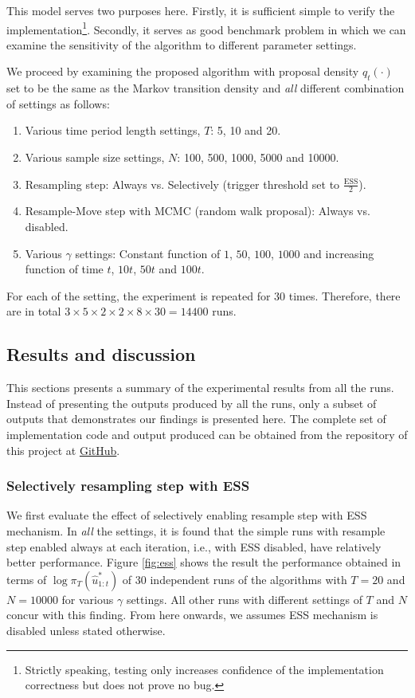 This model serves two purposes here. Firstly, it is sufficient simple to verify the implementation\footnote{Strictly speaking, testing only increases confidence of the implementation correctness but does not prove no bug.}. Secondly, it serves as good benchmark problem in which we can examine the sensitivity of the algorithm to different parameter settings.

We proceed by examining the proposed algorithm with proposal density $q_t(\cdot)$ set to be the same as the Markov transition density and \emph{all} different combination of settings as follows:
\begin{enumerate}
\item Various time period length settings, $T$: 5, 10 and 20.
\item Various sample size settings, $N$: 100, 500, 1000, 5000 and 10000.
\item Resampling step: Always vs. Selectively (trigger threshold set to $\frac{\text{ESS}}{2}$).
\item Resample-Move step with MCMC (random walk proposal): Always vs. disabled.
\item Various $\gamma$ settings: Constant function of $1$, $50$, $100$, $1000$ and increasing function of time $t$, $10t$, $50t$ and $100t$.
\end{enumerate}

For each of the setting, the experiment is repeated for $30$ times. Therefore, there are in total $3 \times 5 \times 2 \times 2 \times 8 \times 30 = 14400$ runs. 

\subsection{Results and discussion}
This sections presents a summary of the experimental results from all the runs. Instead of presenting the outputs produced by all the runs, only a subset of outputs that demonstrates our findings is presented here. The complete set of implementation code and output produced can be obtained from the repository of this project at \href{https://github.com/yowtzu/mscproj}{GitHub}.

\subsubsection{Selectively resampling step with ESS}
We first evaluate the effect of selectively enabling resample step with ESS mechanism. In \emph{all} the settings, it is found that the simple runs with resample step enabled always at each iteration, i.e., with ESS disabled,  have relatively better performance. Figure \ref{fig:ess} shows the result the performance obtained in terms of $\log\pi_T(\hat{u}^*_{1:t})$ of 30 independent runs of the algorithms with $T=20$ and $N=10000$ for various $\gamma$ settings. All other runs with different settings of $T$ and $N$ concur with this finding. From here onwards, we assumes ESS mechanism is disabled unless stated otherwise.

